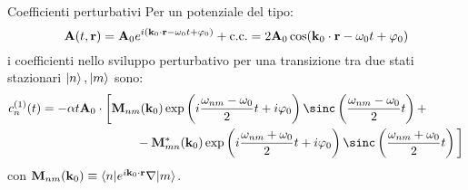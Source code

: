 \begin{proposition}{Coefficienti perturbativi}{}
	Per un potenziale del tipo:
	\begin{equation}
		\mathbf{A}(t,\mathbf{r}) = \mathbf{A}_0 e^{i (\mathbf{k}_0 \cdot \mathbf{r} - \omega_0 t + \varphi_0)} + \text{c.c.} = 2 \mathbf{A}_0 \cos (\mathbf{k}_0 \cdot \mathbf{r} - \omega_0 t + \varphi_0)
	\end{equation}
	i coefficienti nello sviluppo perturbativo per una transizione tra due stati stazionari $ \ket{n} , \ket{m} $ sono:
	\begin{equation}
		\begin{split}
			c_n^{(1)}(t) = - \alpha t \ve{A}_0 \cdot \bigg[
			& \ve{M}_{nm}(\ve{k}_0) \exp \left( i \frac{\omega_{nm} - \omega_0}{2} t + i \varphi_0 \right) \sinc \left( \frac{\omega_{nm} - \omega_0}{2} t \right) + \\
			& \qquad - \ve{M}_{mn}^*(\ve{k}_0) \exp \left( i \frac{\omega_{nm} + \omega_0}{2} t + i \varphi_0 \right) \sinc \left( \frac{\omega_{nm} + \omega_0}{2} t \right) \bigg]
			\label{eq:1-e-big-coeff}
		\end{split}
	\end{equation}
	con $ \mathbf{M}_{nm}(\mathbf{k}_0) \equiv \braket{n | e^{i \mathbf{k}_0 \cdot \mathbf{r}} \nabla | m} $.

	\tcblower


\end{proposition}

